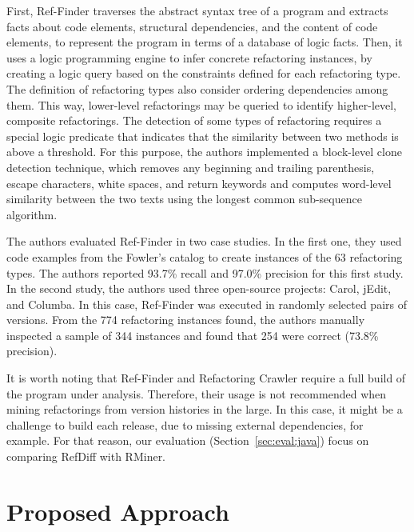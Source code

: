 \documentclass[10pt,journal,compsoc]{IEEEtran}
\begin{document}
First, Ref-Finder traverses the abstract syntax tree of a program and extracts facts about code elements, structural dependencies, and the content of code elements, to represent the program in terms of a database of logic facts. Then, it uses a logic programming engine to infer concrete refactoring instances, by creating a logic query based on the constraints defined for each refactoring type.
The definition of refactoring types also consider ordering dependencies among them. This way, lower-level refactorings may be queried to identify higher-level, composite refactorings.
The detection of some types of refactoring requires a special logic predicate that indicates that the similarity between two methods is above a threshold. For this purpose, the authors implemented a block-level clone detection technique, which removes any beginning and trailing parenthesis, escape characters, white spaces, and return keywords and computes word-level similarity between the two texts using the longest common sub-sequence algorithm.

The authors evaluated Ref-Finder in two case studies.
In the first one, they used code examples from the Fowler's catalog to create instances of the 63 refactoring types. The authors reported 93.7\% recall and 97.0\% precision for this first study.
In the second study, the authors used three open-source projects: Carol, jEdit, and Columba. In this case, Ref-Finder was executed in randomly selected pairs of versions. From the 774 refactoring instances found, the authors manually inspected a sample of 344 instances and found that 254 were correct (73.8\% precision).

It is worth noting that Ref-Finder and Refactoring Crawler require a full build of the program under analysis.
Therefore, their usage is not recommended when mining refactorings from version histories in the large.
In this case, it might be a challenge to build each release, due to missing external dependencies, for example.
For that reason, our evaluation (Section~\ref{sec:eval:java}) focus on comparing RefDiff with RMiner.




\section{Proposed Approach}
\label{SecApproach}
\end{document}
